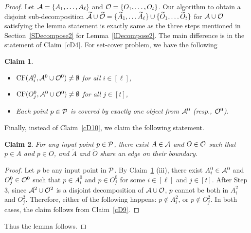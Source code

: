 \documentclass[a4paper,11pt]{article}
\DeclareMathOperator{\CF}{CF}
\newtheorem{claim}{Claim}
\begin{document}
\begin{proof}
   
   
   
Let ${\cal A}=\{A_1,\ldots,A_{\ell}\}$  and ${\cal O}=\{O_1,\ldots,O_t\}$. Our algorithm to obtain a disjoint
sub-decomposition  $\widetilde{\cal A}\cup \widetilde{\cal 
O}=\{\widetilde{A}_1,\ldots 
\widetilde{A}_{\ell}\}\cup\{\widetilde{O}_1,\ldots \widetilde{O}_{t}\}$ for 
${\cal A}\cup {\cal O}$ satisfying the lemma statement is  exactly same as the three steps mentioned in Section~\ref{SDecompose2} for Lemma~\ref{lDecompose2}. 
The main difference is in the statement of Claim~\ref{cD4}. For set-cover problem, we have the following 

\begin{claim}\label{sD0.3}
\begin{itemize}
\item[(i)] $\CF(A^0_i, {\cal A}^0\cup {\cal O}^0)\neq \emptyset$ for all $i\in[\ell]$,
\item[(ii)] $\CF(O^0_j, {\cal A}^0\cup {\cal O}^0)\neq \emptyset$ for all $j\in[t]$,

\item[(iii)] Each point $p\in {\cal P}$ is covered by exactly one object from  ${\cal A}^0$ (resp., ${\cal O}^0$).
\end{itemize}
  
\end{claim}

Finally, instead of Claim~\ref{cD10}, we claim the following statement.

\begin{claim}\label{sD10_c}
 For any input point $p \in {\cal P}$,  there exist 
 ${A}\in {\cal A}$ and 
${O}\in{\cal O}$ such that  $p\in {A}$ and $p \in {O}$, and 
$\widetilde{A}$ and $\widetilde{O}$  share an edge on their boundary.
\end{claim}

\begin{proof}
  Let $p$ be any input point in ${\cal P}$. By Claim~\ref{sD0.3} (iii), there exist 
$A^0_i\in {\cal A}^0$ and $O^0_j\in {\cal O}^0$ such 
that  $p \in A^0_i$ and  $p \in O^0_j$ 
for some $i\in[\ell]$ 
and $j\in [t]$. After Step 3, since  ${\cal 
A}^2\cup {\cal O}^2$ is a disjoint decomposition of ${\cal A}\cup {\cal O}$,  $p$ cannot be both in 
${A^2_i}$ and ${O^2_j}$.  Therefore,    either of the 
following happens: $p \notin 
{A^2_i}$, or $p \notin {O^2_j}$.
In both  cases, the claim follows  from Claim~\ref{cD9}.
\end{proof}   

Thus the lemma follows.
  \end{proof}
\end{document}

